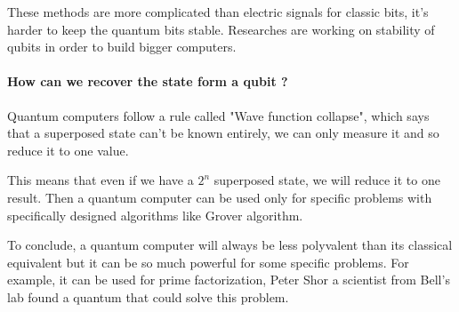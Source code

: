 These methods are more complicated than electric signals for classic bits, it's harder to keep the quantum bits stable. Researches are working on stability of qubits in order to build bigger computers.

\paragraph{How can we recover the state form a qubit ?}

Quantum computers follow a rule called "Wave function collapse", which says that a superposed state can't be known entirely, we can only measure it and so reduce it to one value.

This means that even if we have a $2^n$ superposed state, we will reduce it to one result. Then a quantum computer can be used only for specific problems with specifically designed algorithms like Grover algorithm. \newline

To conclude, a quantum computer will always be less polyvalent than its classical equivalent but it can be so much powerful for some specific problems. For example, it can be used for prime factorization, Peter Shor a scientist from Bell's lab found a quantum that could solve this problem. \newline
